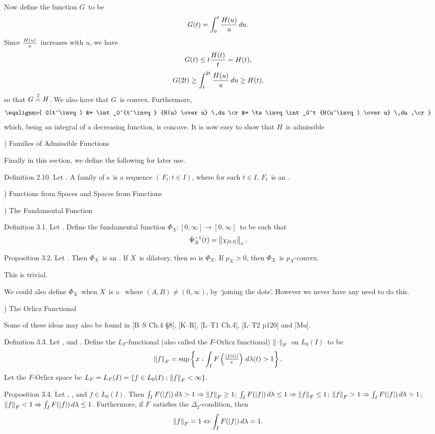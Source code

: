 Now define the function $G$\ to be
$$ G(t) = \int_0^t {H(u) \over u} \,du .$$
Since ${H(u) \over u}$\ increases with $u$, we have
$$ G(t) \le t{H(t) \over t} = H(t) ,$$
$$ G(2t) \ge \int_t^{2t} {H(u) \over u} \,du \ge H(t) ,$$
so that $G\labelledasymp 2 H$. We also have that $G$\ is convex.
Furthermore,
$$ \eqalignno{
   G(t^\invq)
   &= \int_0^{t^\invq} {H(u) \over u} \,du \cr
   &= \ts\invq \int_0^t {H(u^\invq) \over u} \,du ,\cr}$$
which, being an integral of a decreasing function, is concave. It
is
now easy to show that $H$\ is admissible
\endproof
 
) Families of Admissible Functions
 
Finally in this section, we define the following for later use.
 
\proclaim Definition 2.10. Let \Ibasms. A {\dt family of \af s}\onI\
is a sequence
$(\,F_t:t\in I)$, where for each $t\in I$, $F_t$\ is an \af.
 
\vfill
\eject
 
) Functions from Spaces and Spaces from Functions
 
) The Fundamental Function
 
\proclaim Definition 3.1. Let \Xbaris\onIzi. Define the {\dt
fundamental function}
$\Phi_X\colon[0,\infty]\to[0,\infty]$\ to be such that
$$ \tilde\Phi^{-1}_X(t) = \left\| \chi_{[0,t]} \right\|_x .$$
 
\proclaim Proposition 3.2. Let \Xbaris. Then $\Phi_X$\ is an \af.
If $X$\ is
dilatory, then so is $\Phi_X$. If $p_X>0$, then $\Phi_X$\ is $p_X$-convex.
 
\Proof This is trivial.
\endproof
 
We could also define $\Phi_X$\ when $X$\ is a \ris\onIAB\ where
$(A,B)\ne(0,\infty)$, by `joining the dots'. However we never have
any need to
do this.
 
) The Orlicz Functional
 
Some of these ideas may also be found in
[B--S Ch.4 \S8], [K--R], [L--T1 Ch.4], [L--T2 p120] and [Mu].
 
\proclaim Definition 3.3. Let \Ibasms, and \Fbaaf. Define the
{\dt $L_F$-functional} (also called the {\dt $F$-Orlicz functional})
$\left\| \kern0.8pt\cdot\kern0.8pt \right\|_F$\
on $L_0(I)$\ to be
$$ \left\| f \right\|_F =
   \sup \left\{ x : \int_I F\left({\textstyle{\left|f(t)\right|\over x}}\right)
\,d\lambda(t)
   > 1 \right\} .$$
Let the {\dt $F$-Orlicz space} be $L_F = L_F(I) = \{ f\in L_0(I)
: \left\| f \right\|_F < \infty \}$.
 
\proclaim Proposition 3.4. Let \Ibasms, \Fbaaf, and $f\in L_0(I)$.
Then
\ditem{i)}$ \int_I F(\left| f \right|)\,d\lambda > 1 \Rightarrow \left\| f \right\|_F
\ge 1$;
\ditem{ii)}$ \int_I F(\left| f \right|)\,d\lambda \le 1 \Rightarrow \left\| f \right\|_F
\le 1$;
\ditem{iii)}$ \left\| f \right\|_F > 1 \Rightarrow \int_I F(\left| f \right|)\,d\lambda
> 1 $;
\ditem{iv)}$ \left\| f \right\|_F < 1 \Rightarrow \int_I F(\left| f \right|)\,d\lambda
\le 1 $.
\moreproclaim\noindent
Furthermore, if $F$\ satisfies the $\Delta_2$-condition, then
$$ \left\| f \right\|_F = 1 \Leftrightarrow \int_I F(\left| f \right|)\,d\lambda = 1 .$$
 
